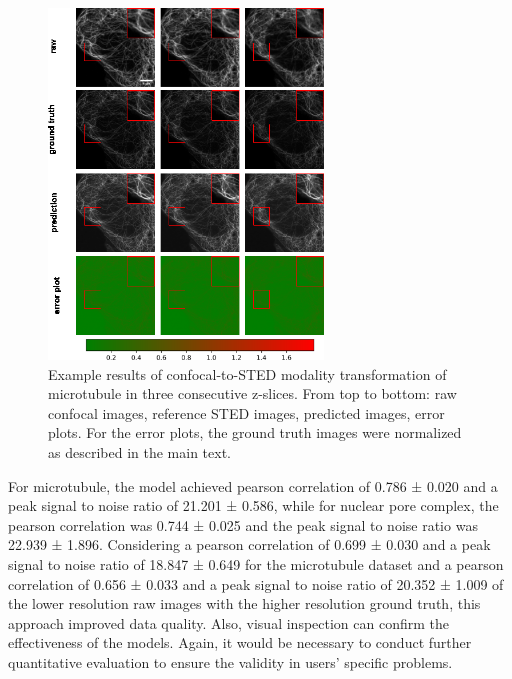 \begin{figure}
\hypertarget{fig:modality_mt}{%
\centering
\includegraphics[width=0.65\textwidth,height=0.7\textheight]{images/mt_manuscript.png}
\caption{Example results of confocal-to-STED modality transformation of microtubule in three consecutive z-slices. From top to bottom: raw confocal images, reference STED images, predicted images, error plots. For the error plots, the ground truth images were normalized as described in the main text.}\label{fig:modality_mt}
}
\end{figure}

For microtubule, the model achieved pearson correlation of 0.786 ± 0.020 and a peak signal to noise ratio of 21.201 ± 0.586, while for nuclear pore complex, the pearson correlation was 0.744 ± 0.025 and the peak signal to noise ratio was 22.939 ± 1.896. Considering a pearson correlation of 0.699 ± 0.030 and a peak signal to noise ratio of 18.847 ± 0.649 for the microtubule dataset and a pearson correlation of 0.656 ± 0.033 and a peak signal to noise ratio of 20.352 ± 1.009 of the lower resolution raw images with the higher resolution ground truth, this approach improved data quality. Also, visual inspection can confirm the effectiveness of the models. Again, it would be necessary to conduct further quantitative evaluation to ensure the validity in users' specific problems.

